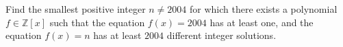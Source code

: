 Find the smallest positive integer $n\neq 2004$ for which there exists a polynomial $f\in\mathbb{Z}[x]$ such that the equation $f(x)=2004$ has at least one, and the equation $f(x)=n$ has at least $2004$ different integer solutions.